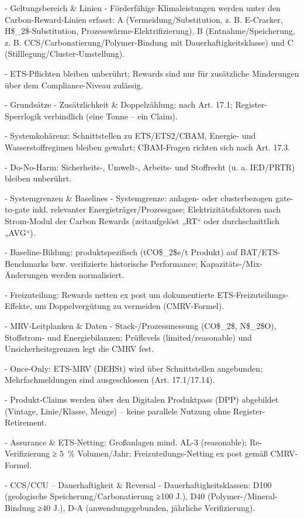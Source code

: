 \documentclass[12pt,a4paper]{scrartcl}
\begin{document}
- Geltungsbereich \& Linien
- Förderfähige Klimaleistungen werden unter den Carbon-Reward-Linien erfasst: A (Vermeidung/Substitution, z. B. E-Cracker, H\$\_2\$-Substitution, Prozesswärme-Elektrifizierung), B (Entnahme/Speicherung, z. B. CCS/Carbonatierung/Polymer-Bindung mit Dauerhaftigkeitsklasse) und C (Stilllegung/Cluster-Umstellung).

- ETS-Pflichten bleiben unberührt; Rewards sind nur für zusätzliche Minderungen über dem Compliance-Niveau zulässig.

- Grundsätze
- Zusätzlichkeit \& Doppelzählung: nach Art. 17.1; Register-Sperrlogik verbindlich (eine Tonne -- ein Claim).

- Systemkohärenz: Schnittstellen zu ETS/ETS2/CBAM, Energie- und Wasserstoffregimen bleiben gewahrt; CBAM-Fragen richten sich nach Art. 17.3.

- Do-No-Harm: Sicherheits-, Umwelt-, Arbeits- und Stoffrecht (u. a. IED/PRTR) bleiben unberührt.

- Systemgrenzen \& Baselines
- Systemgrenze: anlagen- oder clusterbezogen gate-to-gate inkl. relevanter Energieträger/Prozessgase; Elektrizitätsfaktoren nach Strom-Modul der Carbon Rewards (zeitaufgelöst „RT“ oder durchschnittlich „AVG“).

- Baseline-Bildung: produktspezifisch (tCO\$\_2\$e/t Produkt) auf BAT/ETS-Benchmarks bzw. verifizierte historische Performance; Kapazitäts-/Mix-Änderungen werden normalisiert.

- Freizuteilung: Rewards netten ex post um dokumentierte ETS-Freizuteilungs-Effekte, um Doppelvergütung zu vermeiden (CMRV-Formel).

- MRV-Leitplanken \& Daten
- Stack-/Prozessmessung (CO\$\_2\$, N\$\_2\$O), Stoffstrom- und Energiebilanzen; Prüflevels (limited/reasonable) und Unsicherheitsgrenzen legt die CMRV fest.

- Once-Only: ETS-MRV (DEHSt) wird über Schnittstellen angebunden; Mehrfachmeldungen sind ausgeschlossen (Art. 17.1/17.14).

- Produkt-Claims werden über den Digitalen Produktpass (DPP) abgebildet (Vintage, Linie/Klasse, Menge) -- keine parallele Nutzung ohne Register-Retirement.

- Assurance \& ETS-Netting: Großanlagen mind. AL-3 (reasonable); Re-Verifizierung ≥ 5 \% Volumen/Jahr; Freizuteilungs-Netting ex post gemäß CMRV-Formel.

- CCS/CCU -- Dauerhaftigkeit \& Reversal
- Dauerhaftigkeitsklassen: D100 (geologische Speicherung/Carbonatierung ≥100 J.), D40 (Polymer-/Mineral-Bindung ≥40 J.), D-A (anwendungsgebunden, jährliche Verifizierung).
\end{document}

